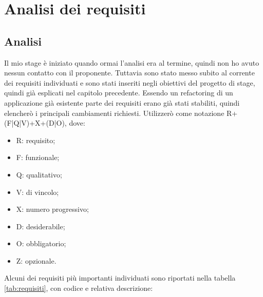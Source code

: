 
\chapter{Analisi dei requisiti}
\label{cap:analisi-requisiti}



\section{Analisi}
Il mio stage è iniziato quando ormai l'analisi era al termine, quindi non ho avuto nessun contatto con il proponente. Tuttavia sono stato messo subito al corrente dei
requisiti individuati e sono stati inseriti negli obiettivi del progetto di stage, quindi già esplicati nel capitolo precedente. Essendo un refactoring di un applicazione
già esistente parte dei requisiti erano già stati stabiliti, quindi elencherò i principali cambiamenti richiesti. Utilizzerò come notazione R+(F|Q|V)+X+(D|O), dove:

\begin{itemize}
  \item R: requisito;
  \item F: funzionale;
  \item Q: qualitativo;
  \item V: di vincolo;
  \item X: numero progressivo;
  \item D: desiderabile;
  \item O: obbligatorio;
  \item Z: opzionale.
\end{itemize}

Alcuni dei requisiti più importanti individuati sono riportati nella tabella \autoref{tab:requisiti}, con codice e relativa descrizione:


